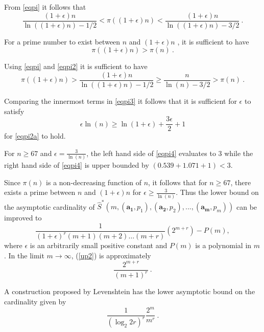\documentclass[12pt]{article} \pagestyle{plain} \topmargin
\begin{document}
From \eqref{eqpi} it follows that
\begin{equation}\label{eqpi2}
\frac{(1+\epsilon)n}{\ln((1+\epsilon)n)-1/2} < \pi((1+\epsilon)n)
< \frac{(1+\epsilon)n}{\ln((1+\epsilon)n)-3/2}~.\end{equation}

For a prime number to exist between $n$ and $(1+\epsilon)n$ , it
is sufficient to have
\begin{equation}\label{eqpi2a} \pi((1+\epsilon)n) > \pi(n)~.
\end{equation}

Using \eqref{eqpi} and \eqref{eqpi2} it is sufficient to have
\begin{equation}\label{eqpi3}\pi((1+\epsilon)n) > \frac{(1+\epsilon)n}{\ln((1+\epsilon)n)-1/2} \geq  \frac{n}{\ln(n)-3/2} > \pi(n)~.
\end{equation}

Comparing the innermost terms in \eqref{eqpi3} it follows that it
is sufficient for $\epsilon$ to satisfy
\begin{equation}\label{eqpi4}
\epsilon \ln(n) \geq \ln(1+\epsilon)+\frac{3\epsilon}{2}+1
\end{equation}
for \eqref{eqpi2a} to hold.

For $n \geq 67$ and $\epsilon = \frac{3}{\ln(n)}$, the left hand
side of \eqref{eqpi4} evaluates to $3$ while the right hand side of
\eqref{eqpi4} is upper bounded by $(0.539+1.071+1) < 3$.

Since $\pi(n)$ is a non-decreasing function of $n$, it follows
that for $n \geq 67$, there exists a prime between $n$ and
$(1+\epsilon)n$ for $\epsilon \geq \frac{3}{\ln(n)}$. Thus the
lower bound on the asymptotic cardinality of
$\hat{S}^*\left(m,(\mathbf{a_1},p_1),(\mathbf{a_2},p_2),...,(\mathbf{a_m},p_m)\right)$
can be improved to
\begin{equation}\label{up2}\frac{1}{(1+\epsilon)^r(m+1)(m+2)\dots(m+r)}
                           \left(2^{m+r}\right)-P(m),\end{equation}
\noindent where $\epsilon$ is an arbitrarily small positive
constant and $P(m)$ is a polynomial in $m$. In the limit $m
\rightarrow \infty$, (\ref{up2}) is approximately
\begin{equation}\frac{2^{m+r}}{(m+1)^r}~.\end{equation}





A construction proposed by Levenshtein \cite{lev:66a} has the
lower asymptotic bound on the cardinality given by
\begin{equation}\label{leven}
\frac{1}{(\log_2 2r)^r}\frac{2^m}{m^r}~.
\end{equation}
\end{document}
